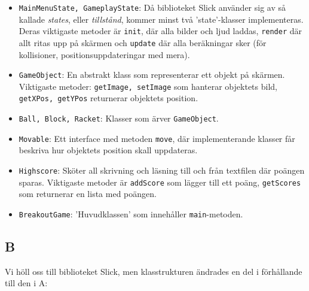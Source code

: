 \documentclass[11pt,a4paper]{article}
\begin{document}
\begin{itemize}
	\item \texttt{MainMenuState, GameplayState}: Då biblioteket Slick använder sig av så kallade \emph{states}, eller \emph{tillstånd}, kommer minst två 'state'-klasser implementeras. Deras viktigaste metoder är \texttt{init}, där alla bilder och ljud laddas, \texttt{render} där allt ritas upp på skärmen och \texttt{update} där alla beräkningar sker (för kollisioner, positionsuppdateringar med mera).
	\item \texttt{GameObject}: En abstrakt klass som representerar ett objekt på skärmen. Viktigaste metoder: \texttt{getImage, setImage} som hanterar objektets bild, \texttt{getXPos, getYPos} returnerar objektets position.
	\item \texttt{Ball, Block, Racket}: Klasser som ärver \texttt{GameObject}.
	\item \texttt{Movable}: Ett interface med metoden \texttt{move}, där implementerande klasser får beskriva hur objektets position skall uppdateras.
	\item \texttt{Highscore}: Sköter all skrivning och läsning till och från textfilen där poängen sparas. Viktigaste metoder är \texttt{addScore} som lägger till ett poäng, \texttt{getScores} som returnerar en lista med poängen.
	\item \texttt{BreakoutGame}: 'Huvudklassen' som innehåller \texttt{main}-metoden.
\end{itemize}

\subsection{B}
Vi höll oss till biblioteket Slick, men klasstrukturen ändrades en del i förhållande till den i A:
\end{document}
